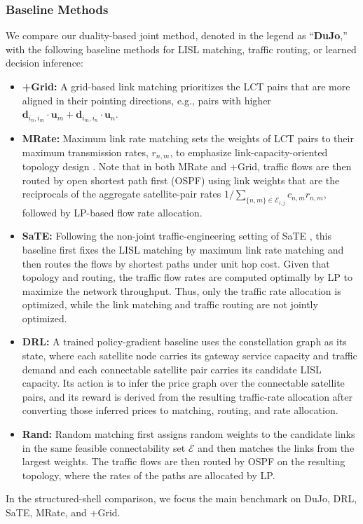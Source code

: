 \documentclass[journal]{IEEEtran}
\begin{document}
\subsubsection{Baseline Methods}
We compare our duality-based joint method, denoted in the legend as ``\textbf{DuJo},'' with the following baseline methods for LISL matching, traffic routing, or learned decision inference:
\begin{itemize}
    \item \textbf{+Grid:} A grid-based link matching \cite{bhattacherjee2019network} prioritizes the LCT pairs that are more aligned in their pointing directions, e.g., pairs with higher $\mathbf{d}_{i_n,i_m} \cdot \mathbf{u}_{m}+\mathbf{d}_{i_m,i_n} \cdot \mathbf{u}_{n}$.
    \item \textbf{MRate:} Maximum link rate matching sets the weights of LCT pairs to their maximum transmission rates, $r_{n,m}$, to emphasize link-capacity-oriented topology design \cite{guo2024constellation}. Note that in both MRate and +Grid, traffic flows are then routed by open shortest path first (OSPF) \cite{moy1998ospf} using link weights that are the reciprocals of the aggregate satellite-pair rates $1/\sum_{\{n,m\}\in \mathcal{E}_{i,j}} c_{n,m}r_{n,m}$, followed by LP-based flow rate allocation.
    \item \textbf{SaTE:} Following the non-joint traffic-engineering setting of SaTE \cite{wu2025sate}, this baseline first fixes the LISL matching by maximum link rate matching and then routes the flows by shortest paths under unit hop cost. Given that topology and routing, the traffic flow rates are computed optimally by LP to maximize the network throughput. Thus, only the traffic rate allocation is optimized, while the link matching and traffic routing are not jointly optimized.
    \item \textbf{DRL:} A trained policy-gradient baseline \cite{sutton2000policy} uses the constellation graph as its state, where each satellite node carries its gateway service capacity and traffic demand and each connectable satellite pair carries its candidate LISL capacity. Its action is to infer the price graph over the connectable satellite pairs, and its reward is derived from the resulting traffic-rate allocation after converting those inferred prices to matching, routing, and rate allocation.
    \item \textbf{Rand:} Random matching first assigns random weights to the candidate links in the same feasible connectability set $\mathcal{E}$ and then matches the links from the largest weights. The traffic flows are then routed by OSPF on the resulting topology, where the rates of the paths are allocated by LP.
\end{itemize}
In the structured-shell comparison, we focus the main benchmark on DuJo, DRL, SaTE, MRate, and +Grid.
\end{document}
